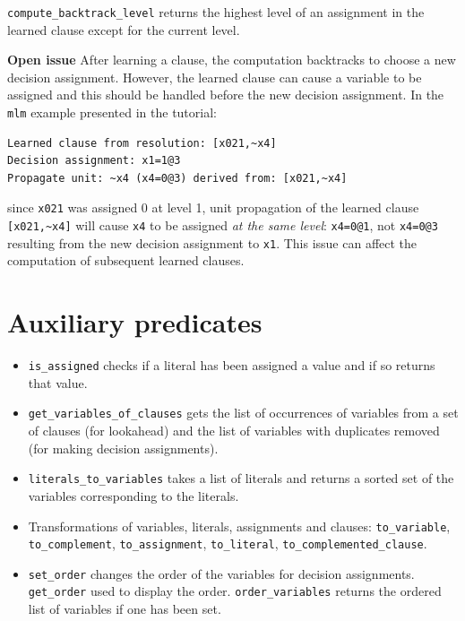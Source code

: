 \documentclass[11pt]{article}
\newcommand*{\p}[1]{\textup{\texttt{#1}}}
\begin{document}
\p{compute\_backtrack\_level} returns the highest level of an assignment
in the learned clause except for the current level.

\textbf{Open issue} After learning a clause, the computation backtracks to choose a new decision assignment. However, the learned clause can cause a variable to be assigned and this should be handled before the new decision assignment. In the \p{mlm} example presented in the tutorial:
\begin{verbatim}
Learned clause from resolution: [x021,~x4]
Decision assignment: x1=1@3
Propagate unit: ~x4 (x4=0@3) derived from: [x021,~x4]
\end{verbatim}
since \p{x021} was assigned 0 at level 1, unit propagation of the learned clause \verb+[x021,~x4]+ will cause \p{x4} to be assigned \emph{at the same level}: \p{x4=0@1}, not \p{x4=0@3} resulting from the new decision assignment to \p{x1}. This issue can affect the computation of subsequent learned clauses.

\section{Auxiliary predicates}\label{s.aux}

\begin{itemize}

\item \p{is\_assigned} checks if a literal has been assigned a value
and if so returns that value.

\item \p{get\_variables\_of\_clauses} gets the list of occurrences of variables from a set of clauses (for lookahead) and the list of variables with duplicates removed (for making decision assignments).

\item \p{literals\_to\_variables} takes a list of literals and returns a
sorted set of the variables corresponding to the literals.

\item Transformations of variables, literals, assignments and clauses: \p{to\_variable}, \p{to\_complement}, \p{to\_assignment}, \p{to\_literal}, \p{to\_complemented\_clause}.

\item \p{set\_order} changes the order of the variables for decision assignments. \p{get\_order} used to display the order. \p{order\_variables} returns the ordered list of variables if one has been set.

\end{itemize}




\end{document}
